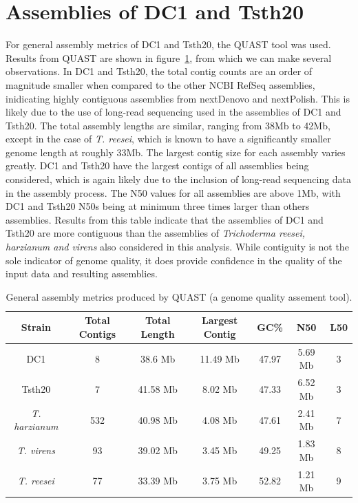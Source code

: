 \section{Assemblies of DC1 and Tsth20}

For general assembly metrics of DC1 and Tsth20, the QUAST tool was
used. Results from QUAST are shown in figure~\ref{table:assemblies},
from which we can make several observations. In DC1 and Tsth20, the
total contig counts are an order of magnitude smaller when compared to
the other NCBI RefSeq assemblies, inidicating highly contiguous
assemblies from nextDenovo and nextPolish. This is likely due to the
use of long-read sequencing used in the assemblies of DC1 and
Tsth20. The total assembly lengths are similar, ranging from 38Mb to
42Mb, except in the case of \textit{T. reesei}, which is known to have
a significantly smaller genome length \cite{Kubicek2019} at roughly
33Mb. The largest contig size for each assembly varies greatly. DC1
and Tsth20 have the largest contigs of all assemblies being
considered, which is again likely due to the inclusion of long-read
sequencing data in the assembly process. The N50 values for all
assemblies are above 1Mb, with DC1 and Tsth20 N50s being at minimum
three times larger than others assemblies. Results from this table
indicate that the assemblies of DC1 and Tsth20 are more contiguous
than the assemblies of \textit{Trichoderma reesei, harzianum and
  virens} also considered in this analysis. While contiguity is not
the sole indicator of genome quality, it does provide confidence in
the quality of the input data and resulting assemblies.

\begin{table}
  \begin{center}
    \begin{tabular}{|c|c|c|c|c|c|c|}
      \hline
      Strain & Total Contigs & Total Length & Largest Contig & GC\% & N50 & L50 \\ \hline
      DC1 & 8 & 38.6 Mb & 11.49 Mb & 47.97 & 5.69 Mb & 3 \\ \hline
      Tsth20 & 7 & 41.58 Mb & 8.02 Mb & 47.33 & 6.52 Mb & 3 \\ \hline
      \textit{T. harzianum} & 532 & 40.98 Mb & 4.08 Mb & 47.61 & 2.41 Mb & 7 \\ \hline
      \textit{T. virens} & 93 & 39.02 Mb & 3.45 Mb & 49.25 & 1.83 Mb & 8 \\ \hline
      \textit{T. reesei} & 77 & 33.39 Mb & 3.75 Mb & 52.82 & 1.21 Mb & 9 \\ \hline
    \end{tabular}
  \end{center}
  \caption{General assembly metrics produced by QUAST (a
    genome quality assement tool).}
  \label{table:assemblies}
\end{table}

